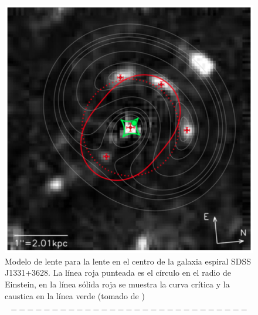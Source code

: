 \begin{figure}
\centering%
\includegraphics[width=0.8\columnwidth]{Kap3/lens_model.png}%
\caption{Modelo de lente para la lente en el centro de la galaxia espiral SDSS J1331+3628. La línea roja punteada es el círculo en el radio de Einstein, en la línea sólida roja se muestra la curva crítica y la caustica en la línea verde (tomado de \cite{TR16})}
\label{fig:lens_model}
\end{figure}


\begin{equation}
-----------------------------
\end{equation}





